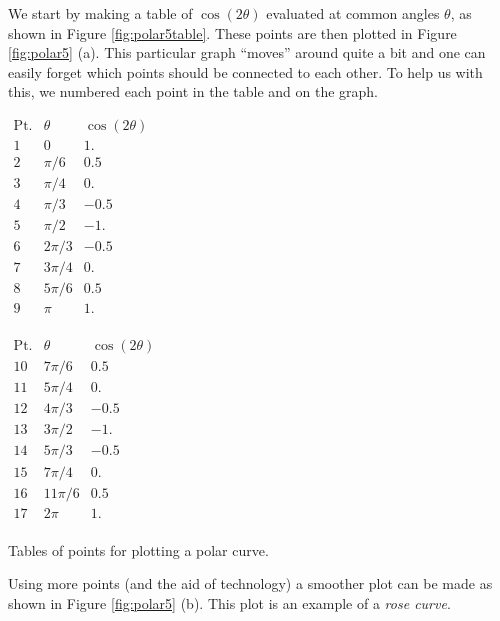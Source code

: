 {We start by making a table of $\cos (2\theta)$ evaluated at common angles $\theta$, as shown in Figure \ref{fig:polar5table}. These points are then plotted in Figure \ref{fig:polar5} (a). This particular graph ``moves'' around quite a bit and one can easily forget which points should be connected to each other. To help us with this, we numbered each point in the table and on the graph. 
\clearpage

\begin{center}
\begin{minipage}[t]{125pt} \vskip0pt
$\begin{array}{ccc}
\text{Pt.} & \theta & \cos (2\theta)\\ \hline
 1 & 0 & 1. \\
 2 & \pi /6 & 0.5 \\
 3 & \pi /4 & 0. \\
 4 & \pi /3 & -0.5 \\
 5 & \pi /2 & -1. \\
 6 & 2 \pi /3 & -0.5 \\
 7 & 3 \pi /4 & 0. \\
 8 & 5 \pi /6 & 0.5 \\
 9 & \pi  & 1. \\
\end{array}$
\end{minipage}
\begin{minipage}[t]{125pt} \vskip 0pt
$\begin{array}{ccc}
\text{Pt.} & \theta & \cos (2\theta)\\ \hline
 10 & 7 \pi /6 & 0.5 \\
 11 & 5 \pi /4 & 0. \\
 12 & 4 \pi /3 & -0.5 \\
 13 & 3 \pi /2 & -1. \\
 14 & 5 \pi /3 & -0.5 \\
 15 & 7 \pi /4 & 0. \\
 16 & 11 \pi /6 & 0.5 \\
 17 & 2 \pi  & 1. \\
\end{array}$
\end{minipage}
\captionsetup{type=figure}
\caption{Tables of points for plotting a polar curve.}\label{fig:polar5table}
\end{center}
Using more points (and the aid of technology) a smoother plot can be made as shown in Figure \ref{fig:polar5} (b). This plot is an example of a \textit{rose curve}.
}\\

